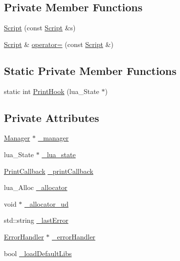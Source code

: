 \subsection*{Private Member Functions}
\begin{DoxyCompactItemize}
\item 
\hyperlink{classSLB_1_1Script_a3a9ac825f6732610f447fb9f9fabe709}{Script} (const \hyperlink{classSLB_1_1Script}{Script} \&s)
\item 
\hyperlink{classSLB_1_1Script}{Script} \& \hyperlink{classSLB_1_1Script_adffe870c40a0cb5835a15617c607bfe1}{operator=} (const \hyperlink{classSLB_1_1Script}{Script} \&)
\end{DoxyCompactItemize}
\subsection*{Static Private Member Functions}
\begin{DoxyCompactItemize}
\item 
static int \hyperlink{classSLB_1_1Script_a65e64bf8902548fd6359cb5ea1b0ac9c}{Print\+Hook} (lua\+\_\+\+State $\ast$)
\end{DoxyCompactItemize}
\subsection*{Private Attributes}
\begin{DoxyCompactItemize}
\item 
\hyperlink{classSLB_1_1Manager}{Manager} $\ast$ \hyperlink{classSLB_1_1Script_a0d7ceb9274c1020d7c30ccb36d9375f4}{\+\_\+manager}
\item 
lua\+\_\+\+State $\ast$ \hyperlink{classSLB_1_1Script_af8ce3649196c31e3d0c4ad3dcb7d7322}{\+\_\+lua\+\_\+state}
\item 
\hyperlink{classSLB_1_1Script_a2d7bd6aeb062fbf4ee45a73b693f389f}{Print\+Callback} \hyperlink{classSLB_1_1Script_ae6e01149454d32d41e22a595d5f05837}{\+\_\+print\+Callback}
\item 
lua\+\_\+\+Alloc \hyperlink{classSLB_1_1Script_ab7ca953cf90c89b26f06cf2832eaf4c8}{\+\_\+allocator}
\item 
void $\ast$ \hyperlink{classSLB_1_1Script_a0313b2a8ca1d0d200d4dfa0ac6d0edfd}{\+\_\+allocator\+\_\+ud}
\item 
std\+::string \hyperlink{classSLB_1_1Script_a4b5f819243c5b043146c1df07098962d}{\+\_\+last\+Error}
\item 
\hyperlink{classSLB_1_1ErrorHandler}{Error\+Handler} $\ast$ \hyperlink{classSLB_1_1Script_aefc5042a29d6834ea1b788013eda4fe9}{\+\_\+error\+Handler}
\item 
bool \hyperlink{classSLB_1_1Script_ac8bf6199c25e1d522576de18baf46be3}{\+\_\+load\+Default\+Libs}
\end{DoxyCompactItemize}


